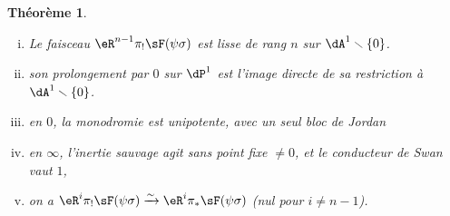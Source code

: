 \documentclass[oneside]{book}
\newcommand{\iso}{\xrightarrow\sim}
\renewcommand{\setminus}{\smallsetminus}
\theoremstyle{sga-source}
\theoremstyle{sga-source-dash}
\theoremstyle{sga-source-dotdash}
\theoremstyle{sga-source-number-note-dash}
\theoremstyle{sga-source-note-number-dotdash}
\theoremstyle{sga-source-example-dotdash}
\theoremstyle{sga-source-inline-number}
\theoremstyle{sga-source-bare-number}
\theoremstyle{sga-source}
\newtheorem{theorem_}[subsection]{Théorème}
\newcommand{\PrintPage}[1]{}\newcommand{\MathPage}[1]{}\newcommand{\PrintCite}[2]{#1}\newcommand{\var}[3]{#1}
\begin{document}
\begin{theorem_}\label{VI:7-8}
\begin{enumerate}[(i)]
  \item Le faisceau $\eR^{n-1}\pi_! \sF(\psi\sigma)$ est lisse de rang $n$ sur 
    $\dA^1\setminus \{0\}$. 
  \item son prolongement par $0$ sur $\dP^1$ est l'image directe de sa 
    restriction à $\dA^1\setminus \{0\}$. 
  \PrintPage{222}
\item en $0$, la monodromie est unipotente, avec un seul bloc de Jordan
  \item en $\infty$, l'inertie sauvage agit sans point fixe $\ne 0$, et le 
    conducteur de Swan vaut $1$, 
  \item on a $\eR^i \pi_! \sF(\psi\sigma) \iso \eR^i \pi_\ast \sF(\psi\sigma)$ 
    (nul pour $i\ne n-1$).
\end{enumerate}
\end{theorem_}
\end{document}
